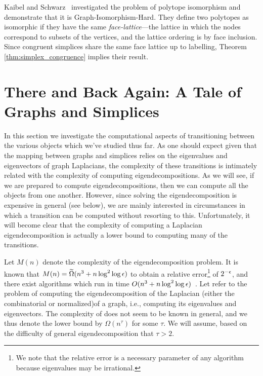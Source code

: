 Kaibel and Schwarz~\cite{kaibel2008complexity} investigated the problem of polytope isomorphism and  demonstrate that it is Graph-Isomorphism-Hard. They define two polytopes as isomorphic if they have the same \emph{face-lattice}---the lattice in which the nodes correspond to subsets of the vertices, and the lattice ordering is by face inclusion. Since congruent simplices share the same face  lattice up to labelling, Theorem \ref{thm:simplex_congruence} implies their result. 


\section{There and Back Again: A Tale of Graphs and Simplices}
\label{sec:algorithmics_transitions}
In this section we investigate the computational aspects of transitioning between the various objects which we've studied thus far. As one should expect given that the mapping between graphs and simplices relies on the  eigenvalues and eigenvectors of graph  Laplacians, the complexity of these transitions is intimately related with the complexity of computing  eigendecompositions. 
As we will see, if we are prepared to compute  eigendecompositions, then we can compute all the objects from one another. 
However, since solving the eigendecomposition is expensive in general (see below), we are mainly interested in circumstances in which a transition can be computed without resorting to this. Unfortunately, it will become clear that the complexity of  computing a Laplacian eigendecomposition is actually a lower bound to computing many of the transitions. 
 
Let $M(n)$ denote the complexity of the eigendecomposition problem. It is known that  $M(n)=\widetilde{\Omega}(n^3 + n\log^2 \log \epsilon)$ to obtain a relative error\footnote{We note that the relative error is a necessary parameter of any algorithm because eigenvalues may be irrational.} of $2^{-\epsilon}$, and there exist algorithms which run in time $O(n^3 + n\log^2 \log \epsilon)$~\cite{pan1999complexity}.  
Let \lapdecomp refer to the problem of computing the eigendecomposition of the Laplacian (either the combinatorial or normalized)of a graph, i.e., computing its eigenvalues and eigenvectors. The complexity of \lapdecomp does not seem to be known  in general, and we thus denote the lower bound by $\Omega(n^\tau)$ for some $\tau$. We will assume, based on the difficulty of general eigendecomposition that $\tau>2$. 


